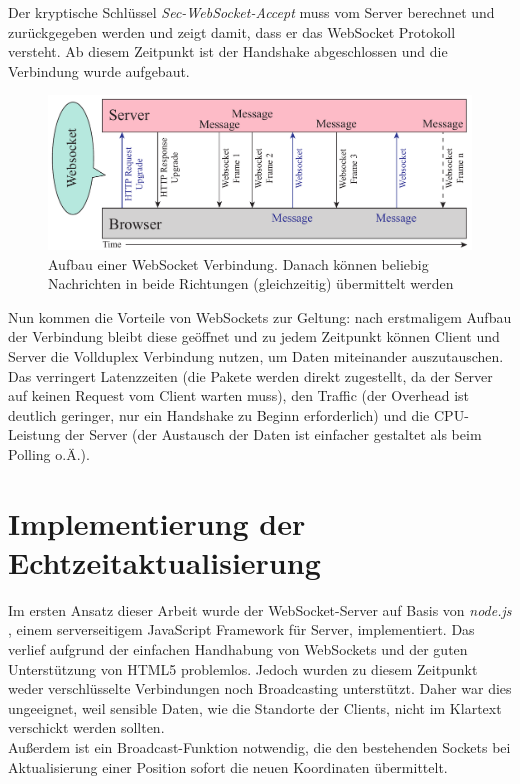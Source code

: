 Der kryptische Schlüssel \emph{Sec-WebSocket-Accept} muss vom Server berechnet und zurückgegeben werden und zeigt damit, dass er das WebSocket Protokoll versteht. Ab diesem Zeitpunkt ist der Handshake abgeschlossen und die Verbindung wurde aufgebaut.\par

\begin{figure}[!ht]
	\centering
	\includegraphics[width=15cm]{fig/websockets}
	\caption[Aufbau einer WebSocket Verbindung]{Aufbau einer WebSocket Verbindung. Danach können beliebig Nachrichten in beide Richtungen (gleichzeitig) übermittelt werden {\cite[S. 7]{ws}}}
\end{figure}

Nun kommen die Vorteile von WebSockets zur Geltung: nach erstmaligem Aufbau der Verbindung bleibt diese geöffnet und zu jedem Zeitpunkt können Client und Server die Vollduplex Verbindung nutzen, um Daten miteinander auszutauschen. Das verringert Latenzzeiten (die Pakete werden direkt zugestellt, da der Server auf keinen Request vom Client warten muss), den Traffic (der Overhead ist deutlich geringer, nur ein Handshake zu Beginn erforderlich) und die CPU-Leistung der Server (der Austausch der Daten ist einfacher gestaltet als beim Polling o.Ä.).

\section{Implementierung der Echtzeitaktualisierung}
Im ersten Ansatz dieser Arbeit wurde der WebSocket-Server auf Basis von \emph{node.js} \cite{node.js}, einem serverseitigem JavaScript Framework für Server, implementiert. Das verlief aufgrund der einfachen Handhabung von WebSockets und der guten Unterstützung von HTML5 problemlos. Jedoch wurden zu diesem Zeitpunkt weder verschlüsselte Verbindungen noch Broadcasting unterstützt. Daher war dies ungeeignet, weil sensible Daten, wie die Standorte der Clients, nicht im Klartext verschickt werden sollten.\\
Außerdem ist ein Broadcast-Funktion notwendig, die den bestehenden Sockets bei Aktualisierung einer Position sofort die neuen Koordinaten übermittelt.\par

